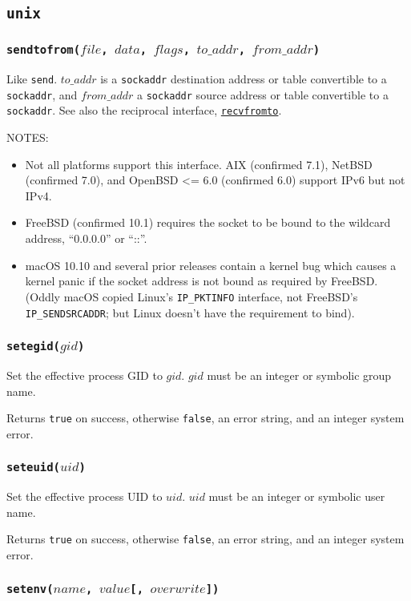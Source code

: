 \documentclass[11pt, oneside]{memoir}
\newcommand*{\true}[0]{\texttt{true}\xspace}
\newcommand*{\false}[0]{\texttt{false}\xspace}
\newcommand*{\syscall}[1]{\texttt{#1}\xspace}
\newcommand*{\fn}[1]{\texttt{#1}\xspace}
\newcommand*{\sockaddr}[0]{\texttt{sockaddr}\xspace}
\newcommand*{\seefn}[1]{\hyperref[#1]{\fn{#1}}\xspace}
\newcounter{toccols}
\newenvironment{Module}[1]{
	\subsection{\texttt{#1}}
	\addtocontents{toc}{
		\protect\begin{multicols}{\value{toccols}}
	}
}{
	\addtocontents{toc}{\protect\end{multicols}}
}
\begin{document}
\begin{Module}{unix}
\subsubsection[\fn{sendtofrom}]{\fn{sendtofrom($file$, $data$, $flags$, $to\_addr$, $from\_addr$)}}

\label{sendtofrom}

Like \syscall{send}. $to\_addr$ is a \sockaddr destination address or table convertible to a \sockaddr, and $from\_addr$ a \sockaddr source address or table convertible to a \sockaddr. See also the reciprocal interface, \seefn{recvfromto}.

NOTES:
\begin{itemize}
\item Not all platforms support this interface. AIX (confirmed 7.1), NetBSD (confirmed 7.0), and OpenBSD <= 6.0 (confirmed 6.0) support IPv6 but not IPv4.
\item FreeBSD (confirmed 10.1) requires the socket to be bound to the wildcard address, ``0.0.0.0'' or ``::''.
\item macOS 10.10 and several prior releases contain a kernel bug which causes a kernel panic if the socket address is not bound as required by FreeBSD. (Oddly macOS copied Linux's \texttt{IP\_PKTINFO} interface, not FreeBSD's \texttt{IP\_SENDSRCADDR}; but Linux doesn't have the requirement to bind).
\end{itemize}

\subsubsection[\fn{setegid}]{\fn{setegid($gid$)}}

Set the effective process GID to $gid$. $gid$ must be an integer or symbolic group name.

Returns \true on success, otherwise \false, an error string, and an integer system error.

\subsubsection[\fn{seteuid}]{\fn{seteuid($uid$)}}

Set the effective process UID to $uid$. $uid$ must be an integer or symbolic user name.

Returns \true on success, otherwise \false, an error string, and an integer system error.

\subsubsection[\fn{setenv}]{\fn{setenv($name$, $value$[, $overwrite$])}}


\end{Module}
\end{document}
